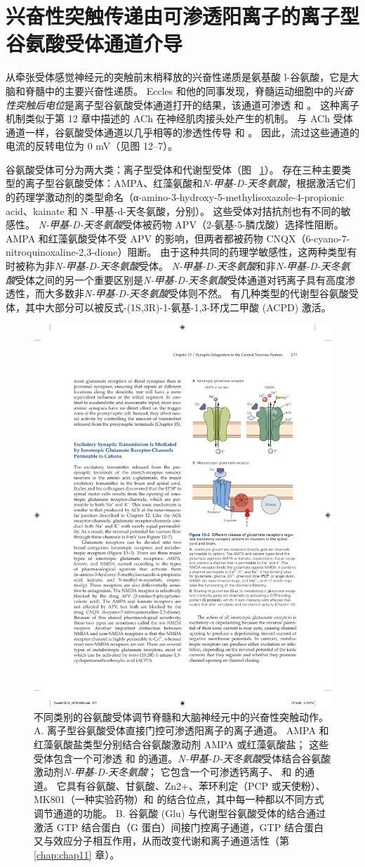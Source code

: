 \section{兴奋性突触传递由可渗透阳离子的离子型谷氨酸受体通道介导}

从牵张受体感觉神经元的突触前末梢释放的兴奋性递质是氨基酸 l-谷氨酸，它是大脑和脊髓中的主要兴奋性递质。
Eccles 和他的同事发现，脊髓运动细胞中的\textit{兴奋性突触后电位}是离子型谷氨酸受体通道打开的结果，该通道可渗透  和 。
这种离子机制类似于第 12 章中描述的 ACh 在神经肌肉接头处产生的机制。
与 ACh 受体通道一样，谷氨酸受体通道以几乎相等的渗透性传导  和 。 因此，流过这些通道的电流的反转电位为 0 mV（见图 12–7）。


谷氨酸受体可分为两大类：离子型受体和代谢型受体（图 ~\ref{fig:13_3}）。 
存在三种主要类型的离子型谷氨酸受体：AMPA、红藻氨酸和\textit{N-甲基-D-天冬氨酸}，根据激活它们的药理学激动剂的类型命名（α-amino-3-hydroxy-5-methylisoxazole-4-propionic acid、kainate 和 N -甲基-d-天冬氨酸，分别）。
这些受体对拮抗剂也有不同的敏感性。
\textit{N-甲基-D-天冬氨酸}受体被药物 APV（2-氨基-5-膦戊酸）选择性阻断。
AMPA 和红藻氨酸受体不受 APV 的影响，但两者都被药物 CNQX（6-cyano-7-nitroquinoxaline-2,3-dione）阻断。
由于这种共同的药理学敏感性，这两种类型有时被称为非\textit{N-甲基-D-天冬氨酸}受体。
\textit{N-甲基-D-天冬氨酸}和非\textit{N-甲基-D-天冬氨酸}受体之间的另一个重要区别是\textit{N-甲基-D-天冬氨酸}受体通道对钙离子具有高度渗透性，而大多数非\textit{N-甲基-D-天冬氨酸}受体则不然。
有几种类型的代谢型谷氨酸受体，其中大部分可以被反式-(1S,3R)-1-氨基-1,3-环戊二甲酸 (ACPD) 激活。


\begin{figure}[htbp]
	\centering
	\includegraphics[width=0.5\linewidth]{chap13/fig_13_3}
	\caption{不同类别的谷氨酸受体调节脊髓和大脑神经元中的兴奋性突触动作。 A. 离子型谷氨酸受体直接门控可渗透阳离子的离子通道。 AMPA 和红藻氨酸盐类型分别结合谷氨酸激动剂 AMPA 或红藻氨酸盐； 这些受体包含一个可渗透  和  的通道。\textit{N-甲基-D-天冬氨酸}受体结合谷氨酸激动剂\textit{N-甲基-D-天冬氨酸}； 它包含一个可渗透钙离子、 和  的通道。 它具有谷氨酸、甘氨酸、Zn2+、苯环利定（PCP 或天使粉）、MK801（一种实验药物）和  的结合位点，其中每一种都以不同方式调节通道的功能。 B. 谷氨酸 (Glu) 与代谢型谷氨酸受体的结合通过激活 GTP 结合蛋白（G 蛋白）间接门控离子通道，GTP 结合蛋白又与效应分子相互作用，从而改变代谢和离子通道活性（第 \ref{chap:chap11} 章）。}
	\label{fig:13_3}
\end{figure}


